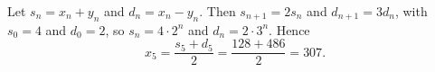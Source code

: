 Let $s_n=x_n+y_n$ and $d_n=x_n-y_n$. Then $s_{n+1}=2s_n$ and $d_{n+1}=3d_n$, with $s_0=4$ and $d_0=2$, so $s_n=4\cdot2^n$ and $d_n=2\cdot3^n$. Hence
\[x_5=\dfrac{s_5+d_5}{2}=\dfrac{128+486}{2}=\boxed{307}.\]
